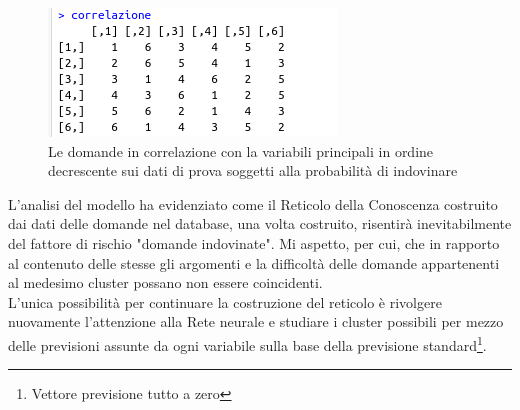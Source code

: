 \begin{figure}[H]
\centering
	\includegraphics[width=0.60\linewidth]{../../PCA/plot/correlazione_with-probability.png}
	\caption{Le domande in correlazione con la variabili principali in ordine decrescente sui dati di prova soggetti alla probabilit\`a di indovinare}
\end{figure}

\noindent L'analisi del modello ha evidenziato come il Reticolo della Conoscenza costruito  dai dati delle domande nel database, una volta costruito, risentir\`a inevitabilmente del fattore di rischio "domande indovinate". Mi aspetto, per cui, che in rapporto al contenuto delle stesse gli argomenti e la difficolt\`a  delle domande appartenenti al medesimo cluster possano non essere coincidenti.\\
L'unica possibilit\`a per continuare la costruzione del reticolo \`e rivolgere nuovamente l'attenzione alla Rete neurale e studiare i cluster possibili per mezzo delle previsioni assunte da ogni variabile sulla base della previsione standard\footnote{Vettore previsione tutto a zero}.
